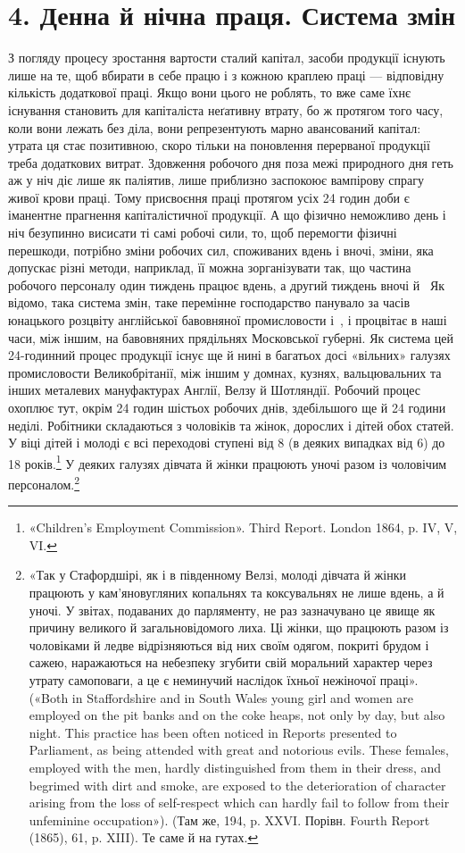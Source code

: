 \section*{4. Денна й нічна праця. Система змін}

З погляду процесу зростання вартости сталий капітал, засоби
продукції існують лише на те, щоб вбирати в себе працю і з кожною
краплею праці — відповідну кількість додаткової праці.
Якщо вони цього не роблять, то вже саме їхнє існування становить
для капіталіста неґативну втрату, бо ж протягом того часу,
коли вони лежать без діла, вони репрезентують марно авансований
капітал: утрата ця стає позитивною, скоро тільки на поновлення
перерваної продукції треба додаткових витрат. Здовження
робочого дня поза межі природного дня геть аж у ніч діє
лише як паліятив, лише приблизно заспокоює вампірову спрагу
живої крови праці. Тому присвоєння праці протягом усіх 24 годин
доби є іманентне прагнення капіталістичної продукції. А що
фізично неможливо день і ніч безупинно висисати ті самі робочі
сили, то, щоб перемогти фізичні перешкоди, потрібно зміни робочих
сил, споживаних вдень і вночі, зміни, яка допускає різні
методи, наприклад, її можна зорганізувати так, що частина робочого
персоналу один тиждень працює вдень, а другий тиждень
вночі й~ Як відомо, така система змін, таке перемінне господарство
панувало за часів юнацького розцвіту англійської бавовняної
промисловости і~, і процвітає в наші часи, між
іншим, на бавовняних прядільнях Московської губерні. Як система
цей 24-годинний процес продукції існує ще й нині в багатьох
досі «вільних» галузях промисловости Великобрітанії, між іншим
у домнах, кузнях, вальцювальних та інших металевих мануфактурах
Англії, Велзу й Шотляндії. Робочий процес охоплює тут,
окрім 24 годин шістьох робочих днів, здебільшого ще й 24 години
неділі. Робітники складаються з чоловіків та жінок, дорослих
і дітей обох статей. У віці дітей і молоді є всі переходові ступені
від 8 (в деяких випадках від 6) до 18 років.\footnote{
«Children’s Employment Commission». Third Report. London
1864, p. IV, V, VI.
} У деяких галузях
дівчата й жінки працюють уночі разом із чоловічим персоналом.\footnote{
«Так у Стафордшірі, як і в південному Велзі, молоді дівчата й жінки
працюють у кам’яновугляних копальнях та коксувальнях не лише вдень,
а й уночі. У звітах, подаваних до парляменту, не раз зазначувано це
явище як причину великого й загальновідомого лиха. Ці жінки, що працюють
разом із чоловіками й ледве відрізняються від них своїм одягом,
покриті брудом і сажею, наражаються на небезпеку згубити свій моральний
характер через утрату самоповаги, а це є неминучий наслідок їхньої
нежіночої праці». («Both in Staffordshire and in South Wales young girl
and women are employed on the pit banks and on the coke heaps, not only
by day, but also night. This practice has been often noticed in Reports presented
to Parliament, as being attended with great and notorious evils.
These females, employed with the men, hardly distinguished from them
in their dress, and begrimed with dirt and smoke, are exposed to the deterioration
of character arising from the loss of self-respect which can hardly
fail to follow from their unfeminine occupation»). (Там же, 194, p. XXVI.
Порівн. Fourth Report (1865), 61, p. XIII). Те саме й на гутах.
}
